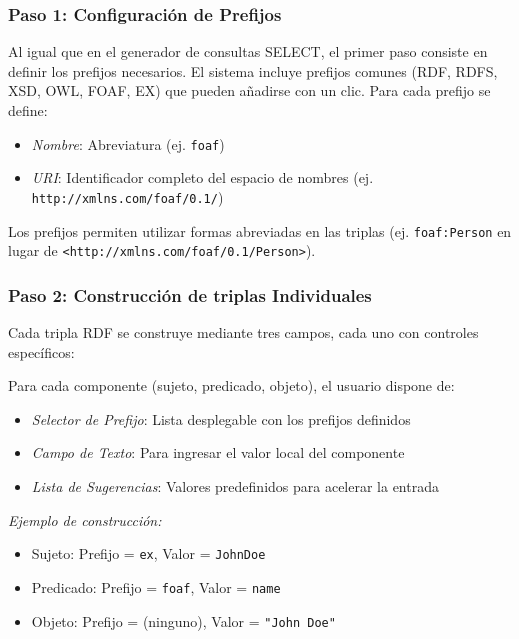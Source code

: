 \documentclass{article}
\begin{document}
\subsubsection{Paso 1: Configuración de Prefijos}
\label{subsubsec:triple-prefix-configuration}

Al igual que en el generador de consultas SELECT, el primer paso consiste en definir los prefijos necesarios. El sistema incluye prefijos comunes (RDF, RDFS, XSD, OWL, FOAF, EX) que pueden añadirse con un clic. Para cada prefijo se define:

\begin{itemize}
    \item \textit{Nombre}: Abreviatura (ej. \texttt{foaf})
    \item \textit{URI}: Identificador completo del espacio de nombres (ej. \texttt{http://xmlns.com/foaf/0.1/})
\end{itemize}

Los prefijos permiten utilizar formas abreviadas en las triplas (ej. \texttt{foaf:Person} en lugar de \texttt{<http://xmlns.com/foaf/0.1/Person>}).

\subsubsection{Paso 2: Construcción de triplas Individuales}
\label{subsubsec:triple-construction}

Cada tripla RDF se construye mediante tres campos, cada uno con controles específicos:

Para cada componente (sujeto, predicado, objeto), el usuario dispone de:

\begin{itemize}
    \item \textit{Selector de Prefijo}: Lista desplegable con los prefijos definidos
    \item \textit{Campo de Texto}: Para ingresar el valor local del componente
    \item \textit{Lista de Sugerencias}: Valores predefinidos para acelerar la entrada
\end{itemize}

\textit{Ejemplo de construcción:}
\begin{itemize}
    \item Sujeto: Prefijo = \texttt{ex}, Valor = \texttt{JohnDoe}
    \item Predicado: Prefijo = \texttt{foaf}, Valor = \texttt{name}
    \item Objeto: Prefijo = (ninguno), Valor = \texttt{"John Doe"}
\end{itemize}
\end{document}
